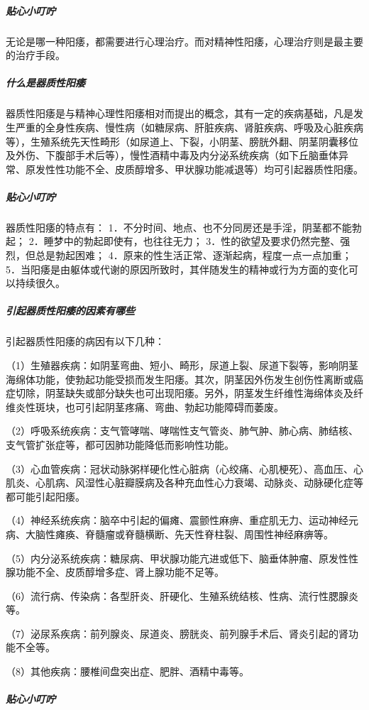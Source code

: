 \begin{enumerate}
\subparagraph{贴心小叮咛}

无论是哪一种阳痿，都需要进行心理治疗。而对精神性阳痿，心理治疗则是最主要的治疗手段。

\subparagraph{什么是器质性阳痿}

器质性阳痿是与精神心理性阳痿相对而提出的概念，其有一定的疾病基础，凡是发生严重的全身性疾病、慢性病（如糖尿病、肝脏疾病、肾脏疾病、呼吸及心脏疾病等），生殖系统先天性畸形（如尿道上、下裂，小阴茎、膀胱外翻、阴茎阴囊移位及外伤、下腹部手术后等），慢性酒精中毒及内分泌系统疾病（如下丘脑垂体异常、原发性性功能不全、皮质醇增多、甲状腺功能减退等）均可引起器质性阳痿。

\subparagraph{贴心小叮咛}

器质性阳痿的特点有：
1．不分时间、地点、也不分同房还是手淫，阴茎都不能勃起；
2．睡梦中的勃起即使有，也往往无力；
3．性的欲望及要求仍然完整、强烈，但总是勃起困难；
4．原来的性生活正常、逐渐起病，程度一点一点加重；
5．当阳痿是由躯体或代谢的原因所致时，其伴随发生的精神或行为方面的变化可以持续很久。

\subparagraph{引起器质性阳痿的因素有哪些}

引起器质性阳痿的病因有以下几种：

（1）生殖器疾病：如阴茎弯曲、短小、畸形，尿道上裂、尿道下裂等，影响阴茎海绵体功能，使勃起功能受损而发生阳痿。其次，阴茎因外伤发生创伤性离断或癌症切除，阴茎缺失或部分缺失也可出现阳痿。另外，阴茎发生纤维性海绵体炎及纤维炎性斑块，也可引起阴茎疼痛、弯曲、勃起功能障碍而萎废。

（2）呼吸系统疾病：支气管哮喘、哮喘性支气管炎、肺气肿、肺心病、肺结核、支气管扩张症等，都可因肺功能降低而影响性功能。

（3）心血管疾病：冠状动脉粥样硬化性心脏病（心绞痛、心肌梗死）、高血压、心肌炎、心肌病、风湿性心脏瓣膜病及各种充血性心力衰竭、动脉炎、动脉硬化症等都可能引起阳痿。

（4）神经系统疾病：脑卒中引起的偏瘫、震颤性麻痹、重症肌无力、运动神经元病、大脑性瘫痪、脊髓瘤或脊髓横断、先天性脊柱裂、周围性神经麻痹等。

（5）内分泌系统疾病：糖尿病、甲状腺功能亢进或低下、脑垂体肿瘤、原发性性腺功能不全、皮质醇增多症、肾上腺功能不足等。

（6）流行病、传染病：各型肝炎、肝硬化、生殖系统结核、性病、流行性腮腺炎等。

（7）泌尿系疾病：前列腺炎、尿道炎、膀胱炎、前列腺手术后、肾炎引起的肾功能不全等。

（8）其他疾病：腰椎间盘突出症、肥胖、酒精中毒等。

\subparagraph{贴心小叮咛}


\end{enumerate}
